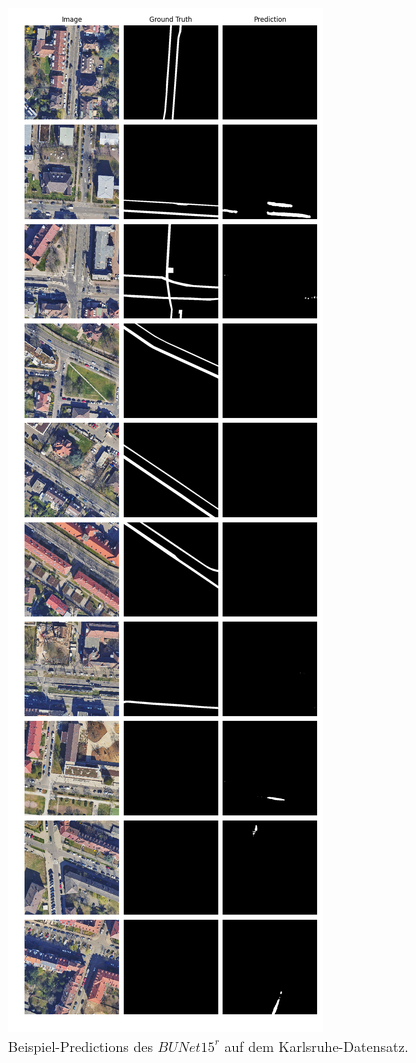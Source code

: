 \begin{figure}
	\centering
	\includegraphics[width=.41\textwidth]{Bilder/Samples-KA/bunet15-r.png} 
	\caption{Beispiel-Predictions des $BUNet15^r$ auf dem Karlsruhe-Datensatz.}
	\label{fig:ka-samples-bunet15-r}
\end{figure}

